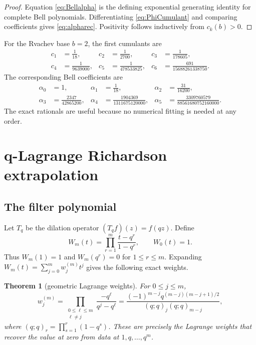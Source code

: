 \documentclass[11pt]{article}
\newtheorem{theorem}{Theorem}[section]
\theoremstyle{definition}
\theoremstyle{remark}
\begin{document}
\begin{proof}
Equation \eqref{eq:Bellalpha} is the defining exponential generating identity for
complete Bell polynomials. Differentiating \eqref{eq:PhiCumulant} and comparing
coefficients gives \eqref{eq:alpharec}. Positivity follows inductively from
\(c_k(b)>0\).
\end{proof}

For the Rvachev base \(b=2\), the first cumulants are
\begin{align*}
 c_1&=\frac1{18},&c_2&=\frac1{2700},&c_3&=\frac1{178605},\\
 c_4&=\frac1{9639000},&c_5&=\frac1{478533825},&
 c_6&=\frac{691}{15688261338750}.
\end{align*}
The corresponding Bell coefficients are
\begin{align}
 \alpha_0&=1,&
 \alpha_1&=\frac1{18},&
 \alpha_2&=\frac{31}{16200},\\
 \alpha_3&=\frac{2347}{42865200},&
 \alpha_4&=\frac{1904369}{1311675120000},&
 \alpha_5&=\frac{3309760579}{88561680752160000}.
 \label{eq:alphaB2}
\end{align}
The exact rationals are useful because no numerical fitting is needed at any
order.

\section{q-Lagrange Richardson extrapolation}
\label{sec:filter}

\subsection{The filter polynomial}

Let \(T_q\) be the dilation operator \((T_qf)(z)=f(qz)\). Define
\begin{equation}
 W_m(t)=\prod_{r=1}^m\frac{t-q^r}{1-q^r},
 \qquad W_0(t)=1.
 \label{eq:Wm}
\end{equation}
Thus \(W_m(1)=1\) and \(W_m(q^r)=0\) for \(1\leq r\leq m\).
Expanding \(W_m(t)=\sum_{j=0}^m w_j^{(m)}t^j\) gives the following exact
weights.

\begin{theorem}[geometric Lagrange weights]
\label{thm:weights}
For \(0\leq j\leq m\),
\begin{equation}
 w_j^{(m)}
 =\prod_{\substack{0\leq\ell\leq m\\\ell\ne j}}
 \frac{-q^\ell}{q^j-q^\ell}
 =\frac{(-1)^{m-j}q^{(m-j)(m-j+1)/2}}
 {(q;q)_j(q;q)_{m-j}},
 \label{eq:weights}
\end{equation}
where \((q;q)_r=\prod_{s=1}^r(1-q^s)\). These are precisely the Lagrange
weights that recover the value at zero from data at \(1,q,\ldots,q^m\).
\end{theorem}
\end{document}

